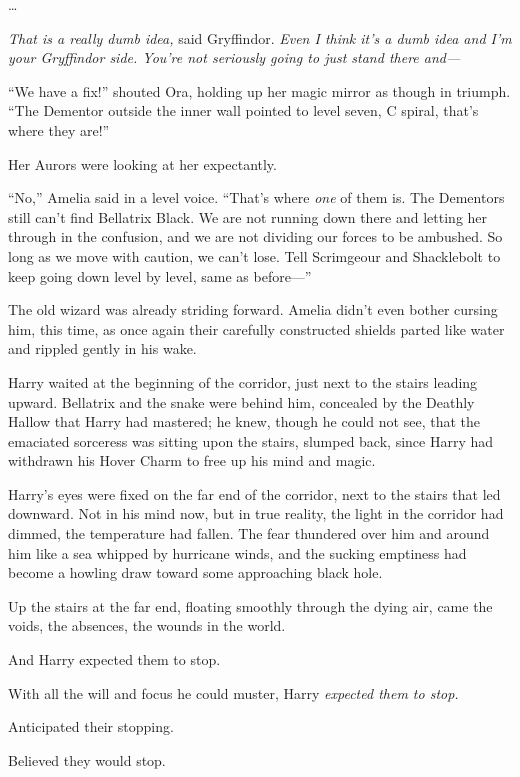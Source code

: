 …

\emph{That is a really dumb idea,} said Gryffindor. \emph{Even I think it’s a dumb idea and I’m your Gryffindor side. You’re not seriously going to just stand there and—}

\later

“We have a fix!” shouted Ora, holding up her magic mirror as though in triumph. “The Dementor outside the inner wall pointed to level seven, C spiral, that’s where they are!”

Her Aurors were looking at her expectantly.

“No,” Amelia said in a level voice. “That’s where \emph{one} of them is. The Dementors still can’t find Bellatrix Black. We are not running down there and letting her through in the confusion, and we are not dividing our forces to be ambushed. So long as we move with caution, we can’t lose. Tell Scrimgeour and Shacklebolt to keep going down level by level, same as before—”

The old wizard was already striding forward. Amelia didn’t even bother cursing him, this time, as once again their carefully constructed shields parted like water and rippled gently in his wake.

\later

Harry waited at the beginning of the corridor, just next to the stairs leading upward. Bellatrix and the snake were behind him, concealed by the Deathly Hallow that Harry had mastered; he knew, though he could not see, that the emaciated sorceress was sitting upon the stairs, slumped back, since Harry had withdrawn his Hover Charm to free up his mind and magic.

Harry’s eyes were fixed on the far end of the corridor, next to the stairs that led downward. Not in his mind now, but in true reality, the light in the corridor had dimmed, the temperature had fallen. The fear thundered over him and around him like a sea whipped by hurricane winds, and the sucking emptiness had become a howling draw toward some approaching black hole.

Up the stairs at the far end, floating smoothly through the dying air, came the voids, the absences, the wounds in the world.

And Harry expected them to stop.

With all the will and focus he could muster, Harry \emph{expected them to stop.}

Anticipated their stopping.

Believed they would stop.

